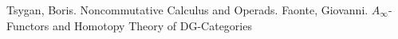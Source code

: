 
% 


\begin{thebibliography}{}
 Tsygan, Boris. Noncommutative Calculus and Operads.
 Faonte, Giovanni. $A_\infty$-Functors and Homotopy Theory of DG-Categories
\end{thebibliography}